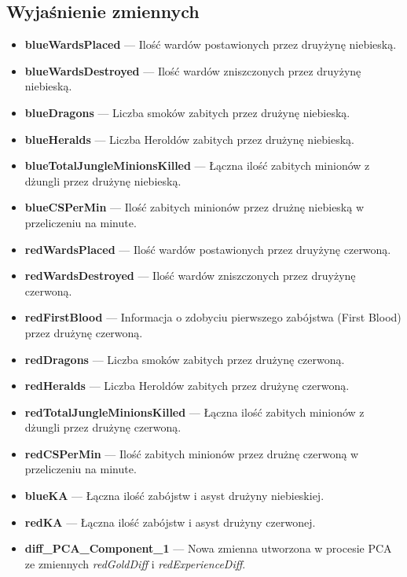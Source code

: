 \documentclass[twoside]{customStyle}
\begin{document}
\subsection{Wyjaśnienie zmiennych}
\begin{itemize}
	\item {\bf blueWardsPlaced} --- Ilość wardów postawionych przez druyżynę niebieską.
	\item {\bf blueWardsDestroyed} --- Ilość wardów zniszczonych przez druyżynę niebieską. 
	\item {\bf blueDragons} --- Liczba smoków zabitych przez drużynę niebieską.
	\item {\bf blueHeralds} --- Liczba Heroldów zabitych przez drużynę niebieską.
	\item {\bf blueTotalJungleMinionsKilled} --- Łączna ilość zabitych minionów z dżungli przez drużynę niebieską.
	\item {\bf blueCSPerMin} --- Ilość zabitych minionów przez drużnę niebieską w przeliczeniu na minute.
	\item {\bf redWardsPlaced} --- Ilość wardów postawionych przez druyżynę czerwoną.
	\item {\bf redWardsDestroyed} ---  Ilość wardów zniszczonych przez druyżynę czerwoną. 
	\item {\bf redFirstBlood} --- Informacja o zdobyciu pierwszego zabójstwa (First Blood) przez drużynę czerwoną.
	\item {\bf redDragons} ---  Liczba smoków zabitych przez drużynę czerwoną.
	\item {\bf redHeralds} --- Liczba Heroldów zabitych przez drużynę czerwoną.
	\item {\bf redTotalJungleMinionsKilled} --- Łączna ilość zabitych minionów z dżungli przez drużynę czerwoną.
	\item {\bf redCSPerMin} --- Ilość zabitych minionów przez drużnę czerwoną w przeliczeniu na minute.
	\item {\bf blueKA} --- Łączna ilość zabójstw i asyst drużyny niebieskiej.
	\item {\bf redKA} --- Łączna ilość zabójstw i asyst drużyny czerwonej.
	\item {\bf diff\_PCA\_Component\_1} --- Nowa zmienna utworzona w procesie PCA ze zmiennych \textit{redGoldDiff} i \textit{redExperienceDiff}.
\end{itemize}
\newpage
\end{document}
